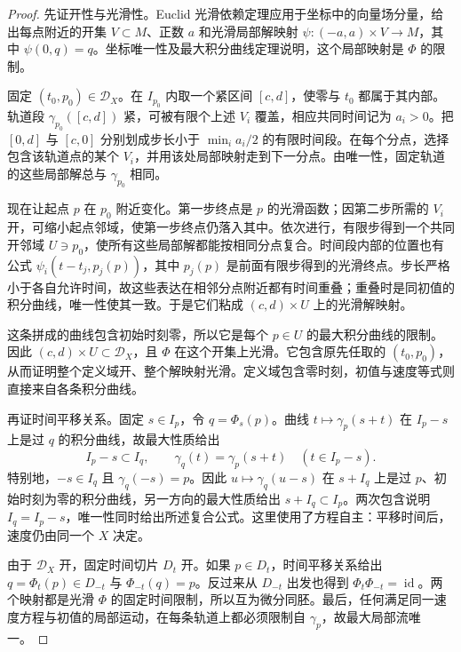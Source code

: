 \begin{proof}
	先证开性与光滑性。Euclid 光滑依赖定理应用于坐标中的向量场分量，给出每点附近的开集 \(V\subset M\)、正数 \(a\) 和光滑局部解映射 \(\psi:(-a,a)\times V\to M\)，其中 \(\psi(0,q)=q\)。坐标唯一性及最大积分曲线定理说明，这个局部映射是 \(\Phi\) 的限制。

	固定 \((t_0,p_0)\in\mathcal D_X\)。在 \(I_{p_0}\) 内取一个紧区间 \([c,d]\)，使零与 \(t_0\) 都属于其内部。轨道段 \(\gamma_{p_0}([c,d])\) 紧，可被有限个上述 \(V_i\) 覆盖，相应共同时间记为 \(a_i>0\)。把 \([0,d]\) 与 \([c,0]\) 分别划成步长小于 \(\min_i a_i/2\) 的有限时间段。在每个分点，选择包含该轨道点的某个 \(V_i\)，并用该处局部映射走到下一分点。由唯一性，固定轨道的这些局部解总与 \(\gamma_{p_0}\) 相同。

	现在让起点 \(p\) 在 \(p_0\) 附近变化。第一步终点是 \(p\) 的光滑函数；因第二步所需的 \(V_i\) 开，可缩小起点邻域，使第一步终点仍落入其中。依次进行，有限步得到一个共同开邻域 \(U\ni p_0\)，使所有这些局部解都能按相同分点复合。时间段内部的位置也有公式 \(\psi_i(t-t_j,p_j(p))\)，其中 \(p_j(p)\) 是前面有限步得到的光滑终点。步长严格小于各自允许时间，故这些表达在相邻分点附近都有时间重叠；重叠时是同初值的积分曲线，唯一性使其一致。于是它们粘成 \((c,d)\times U\) 上的光滑解映射。

	这条拼成的曲线包含初始时刻零，所以它是每个 \(p\in U\) 的最大积分曲线的限制。因此 \((c,d)\times U\subset\mathcal D_X\)，且 \(\Phi\) 在这个开集上光滑。它包含原先任取的 \((t_0,p_0)\)，从而证明整个定义域开、整个解映射光滑。定义域包含零时刻，初值与速度等式则直接来自各条积分曲线。

	再证时间平移关系。固定 \(s\in I_p\)，令 \(q=\Phi_s(p)\)。曲线 \(t\mapsto\gamma_p(s+t)\) 在 \(I_p-s\) 上是过 \(q\) 的积分曲线，故最大性质给出
	\[
		I_p-s\subset I_q,\qquad \gamma_q(t)=\gamma_p(s+t)\quad(t\in I_p-s).
	\]
	特别地，\(-s\in I_q\) 且 \(\gamma_q(-s)=p\)。因此 \(u\mapsto\gamma_q(u-s)\) 在 \(s+I_q\) 上是过 \(p\)、初始时刻为零的积分曲线，另一方向的最大性质给出 \(s+I_q\subset I_p\)。两次包含说明 \(I_q=I_p-s\)，唯一性同时给出所述复合公式。这里使用了方程自主：平移时间后，速度仍由同一个 \(X\) 决定。

	由于 \(\mathcal D_X\) 开，固定时间切片 \(D_t\) 开。如果 \(p\in D_t\)，时间平移关系给出 \(q=\Phi_t(p)\in D_{-t}\) 与 \(\Phi_{-t}(q)=p\)。反过来从 \(D_{-t}\) 出发也得到 \(\Phi_t\Phi_{-t}=\operatorname{id}\)。两个映射都是光滑 \(\Phi\) 的固定时间限制，所以互为微分同胚。最后，任何满足同一速度方程与初值的局部运动，在每条轨道上都必须限制自 \(\gamma_p\)，故最大局部流唯一。
\end{proof}


